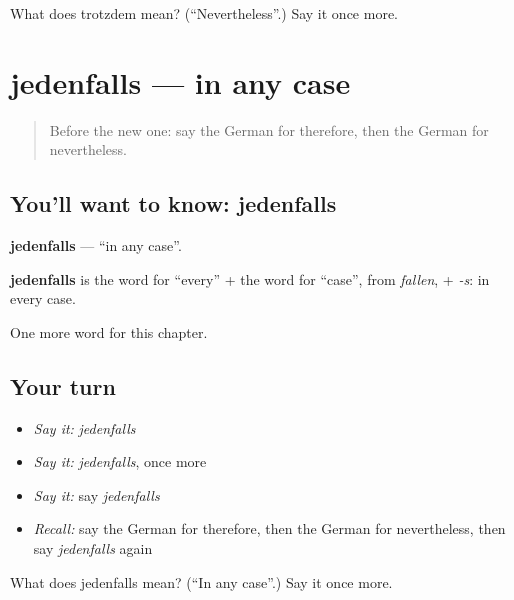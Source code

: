 \begin{tcolorbox}[breakable,colback=teal!4,colframe=teal!35!black,title={Before you move on}]
What does trotzdem mean? (\textquotedblleft{}Nevertheless\textquotedblright{}.) Say it once more.
\end{tcolorbox}
\section[jedenfalls]{jedenfalls — in any case}

\label{lesson:GE-C250-jedenfalls}



\begin{quote}
Before the new one: say the German for therefore, then the German for nevertheless.
\end{quote}

\subsection*{You'll want to know: jedenfalls}
\textbf{jedenfalls} — \textquotedblleft{}in any case\textquotedblright{}.

\begin{cousinweb}
\textbf{jedenfalls} is the word for \textquotedblleft{}every\textquotedblright{} + the word for \textquotedblleft{}case\textquotedblright{}, from \emph{fallen}, + \emph{-s}: in every case.
\end{cousinweb}

\begin{grammarlens}[title={What you've built}]
One more word for this chapter.
\end{grammarlens}

\subsection*{Your turn}
\begin{itemize}
\raggedright
  \item \emph{Say it:} \emph{jedenfalls}
  \item \emph{Say it:} \emph{jedenfalls}, once more
  \item \emph{Say it:} say \emph{jedenfalls}
  \item \emph{Recall:} say the German for therefore, then the German for nevertheless, then say \emph{jedenfalls} again
\end{itemize}

\begin{tcolorbox}[breakable,colback=teal!4,colframe=teal!35!black,title={Before you move on}]
What does jedenfalls mean? (\textquotedblleft{}In any case\textquotedblright{}.) Say it once more.
\end{tcolorbox}
